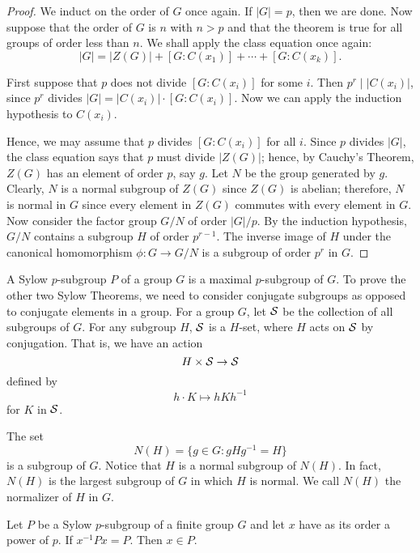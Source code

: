  
\begin{proof}
We induct on the order of $G$ once again.  If $|G|=p$, then we are
done. Now suppose that the order of $G$ is $n$ with $n>p$ and that the
theorem is true for all groups of order less than $n$. We shall apply
the class equation once again: 
$$
|G| = |Z(G)| + [G: C(x_1) ] + \cdots + [ G: C(x_k)].
$$
 
 
First suppose that $p$ does not divide $[G:C(x_i)]$ for some $i$. Then
\mbox{$p^r \mid |C(x_i)|$}, since $p^r$ divides $|G| = |C(x_i)| \cdot
[G:C(x_i)]$. Now we can apply the induction hypothesis to $C(x_i)$.  
 
 
Hence, we may assume that $p$ divides $[G:C(x_i)]$ for all $i$.
Since $p$ divides $|G|$, the class equation says that $p$ must
divide $|Z(G)|$; hence, by Cauchy's Theorem, $Z(G)$ has an element of
order $p$, say $g$. Let $N$ be the group generated by $g$. Clearly,
$N$ is a normal subgroup of $Z(G)$ since $Z(G)$ is abelian; therefore,
$N$ is normal in $G$ since every element in $Z(G)$ commutes with every
element in $G$. Now consider the factor group $G/N$ of order $|G|/p$.
By the induction hypothesis, $G/N$ contains a subgroup $H$ of order
$p^{r- 1}$. The inverse image of $H$ under the canonical homomorphism
$\phi : G \rightarrow G/N$ is a subgroup of order $p^r$ in $G$. 
\end{proof}
 
 
\medskip
 
 
A {\bfi Sylow $p$-subgroup}  $P$ of a group $G$ is a
maximal $p$-subgroup of $G$. To prove the other two Sylow Theorems, we
need to consider conjugate subgroups as opposed to conjugate elements
in a group. For a group $G$, let ${\cal S}$ be the collection of all
subgroups of $G$. For any subgroup $H$, ${\cal S}$ is a $H$-set, where 
$H$ acts on ${\cal S}$ by conjugation. That is, we have an action 
$$
H \times  {\cal S}  \rightarrow  {\cal S}
$$
defined by
$$
h \cdot K \mapsto hKh^{-1}
$$
for $K$ in ${\cal S}$.
 
 
The set
$$
N(H) = \{  g \in G : g H g^{-1} = H\}\label{notenormalizer}
$$
is a subgroup of $G$. Notice that $H$ is a normal subgroup of $N(H)$.
In fact, $N(H)$ is the largest subgroup of $G$ in which $H$ is normal.
We call $N(H)$ the {\bfi normalizer\/} of $H$ in $G$.
 
 
\begin{lemma}
Let $P$ be a Sylow $p$-subgroup of a finite group $G$ and let $x$ have
as its order a power of $p$. If $x^{-1} P x = P$. Then $x \in P$.
\end{lemma}
 

